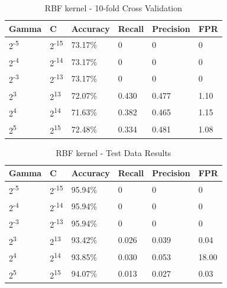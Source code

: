 \documentclass[conference]{IEEEtran}
\begin{document}
\begin{table}[!h]
\caption{RBF kernel - 10-fold Cross Validation}
\begin{center}
\begin{tabular}{ | l | l | l | l | l | l |}
\hline
Gamma & C & Accuracy & Recall & Precision & FPR \\
\hline\hline
2\textsuperscript{-5} & 2\textsuperscript{-15} & 73.17\% & 0 & 0 & 0 \\
\hline
2\textsuperscript{-4} & 2\textsuperscript{-14} & 73.17\% & 0 & 0 & 0 \\
\hline
2\textsuperscript{-3} & 2\textsuperscript{-13} & 73.17\% & 0 & 0 & 0 \\
\hline
2\textsuperscript{3} & 2\textsuperscript{13} & 72.07\% & 0.430 & 0.477 & 1.10 \\
\hline
2\textsuperscript{4} & 2\textsuperscript{14} & 71.63\% & 0.382 & 0.465 & 1.15 \\
\hline
2\textsuperscript{5} & 2\textsuperscript{15} & 72.48\% & 0.334 & 0.481 & 1.08 \\
\hline
\end{tabular}
\end{center}
\end{table}


 \begin{table}[!h]
\caption{RBF kernel - Test Data Results}
\begin{center}
\begin{tabular}{ | l | l | l | l | l | l |}
\hline
Gamma & C & Accuracy & Recall & Precision & FPR \\
\hline\hline
2\textsuperscript{-5} & 2\textsuperscript{-15} & 95.94\% & 0 & 0 & 0 \\
\hline
2\textsuperscript{-4} & 2\textsuperscript{-14} & 95.94\% & 0 & 0 & 0 \\
\hline
2\textsuperscript{-3} & 2\textsuperscript{-13} & 95.94\% & 0 & 0 & 0 \\
\hline
2\textsuperscript{3} & 2\textsuperscript{13} & 93.42\% & 0.026 & 0.039 & 0.04 \\
\hline
2\textsuperscript{4} & 2\textsuperscript{14} & 93.85\% & 0.030 & 0.053 & 18.00 \\
\hline
2\textsuperscript{5} & 2\textsuperscript{15} & 94.07\% & 0.013 & 0.027 & 0.03 \\
\hline
\end{tabular}
\end{center}
\end{table}
\end{document}
